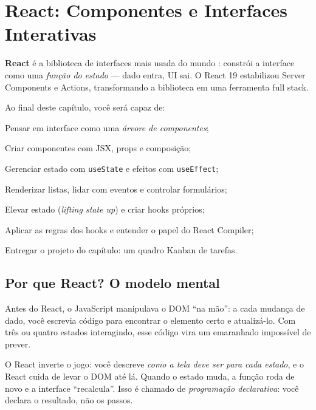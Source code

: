 \chapter{React: Componentes e Interfaces Interativas}
\label{cap:react}

\begin{caixaconceito}
\textbf{React} é a biblioteca de interfaces mais usada do mundo
\cite{so2025,stateofjs2024}: constrói a interface como uma \emph{função do
estado} — dado entra, UI sai. O React 19 \cite{react19} estabilizou Server
Components e Actions, transformando a biblioteca em uma ferramenta full stack.
\end{caixaconceito}

Ao final deste capítulo, você será capaz de:
\begin{objetivos}
  \item Pensar em interface como uma \emph{árvore de componentes};
  \item Criar componentes com JSX, props e composição;
  \item Gerenciar estado com \texttt{useState} e efeitos com \texttt{useEffect};
  \item Renderizar listas, lidar com eventos e controlar formulários;
  \item Elevar estado (\emph{lifting state up}) e criar hooks próprios;
  \item Aplicar as regras dos hooks e entender o papel do React Compiler;
  \item Entregar o projeto do capítulo: um quadro Kanban de tarefas.
\end{objetivos}

\section{Por que React? O modelo mental}

Antes do React, o JavaScript manipulava o DOM ``na mão'': a cada mudança de
dado, você escrevia código para encontrar o elemento certo e atualizá-lo. Com
três ou quatro estados interagindo, esse código vira um emaranhado impossível
de prever.

O React inverte o jogo: você descreve \emph{como a tela deve ser para cada
estado}, e o React cuida de levar o DOM até lá. Quando o estado muda, a função
roda de novo e a interface ``recalcula''. Isso é chamado de
\emph{programação declarativa}: você declara o resultado, não os passos.

